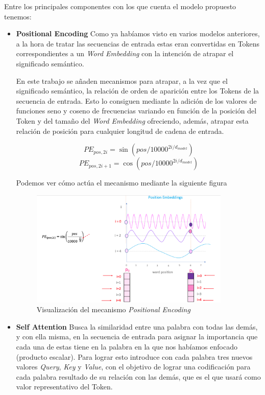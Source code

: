 Entre los principales componentes con los que cuenta el modelo propuesto tenemos:
\begin{itemize}
	\item\textbf{Positional Encoding} Como ya habíamos visto en varios modelos anteriores, a la hora de tratar las secuencias de entrada estas eran convertidas en Tokens correspondientes a un \textit{Word Embedding} con la intención de atrapar el significado semántico.

En este trabajo se añaden mecanismos para atrapar, a la vez que el significado semántico, la relación de orden de aparición entre los Tokens de la secuencia de entrada. Esto lo consiguen mediante la adición de los valores de funciones seno y coseno de frecuencias variando en función de la posición del Token y del tamaño del \textit{Word Embedding} ofreciendo, además, atrapar esta relación de posición para cualquier longitud de cadena de entrada.

\[PE_{pos,2i} = \sin(pos/10000^{2i/d_{model}})\]
\[PE_{pos,2i+1} = \cos(pos/10000^{2i/d_{model}})\]

Podemos ver cómo actúa el mecanismo mediante la siguiente figura

\begin{figure}
	\centering
	\includegraphics[width = 0.9\textwidth]{Imagenes/Vectorial/PositionalEncoding.pdf}
	\caption{Visualización del mecanismo \textit{Positional Encoding}}%
	\label{fig:Positional Encoding}
\end{figure}

	\item\textbf{Self Attention} Busca la similaridad entre una palabra con todas las demás, y con ella misma, en la secuencia de entrada para asignar la importancia que cada una de estas tiene en la palabra en la que nos habíamos enfocado (producto escalar). Para lograr esto introduce con cada palabra tres nuevos valores \textit{Query}, \textit{Key} y \textit{Value}, con el objetivo de lograr una codificación para cada palabra resultado de su relación con las demás, que es el que usará como valor representativo del Token.


\end{itemize}
